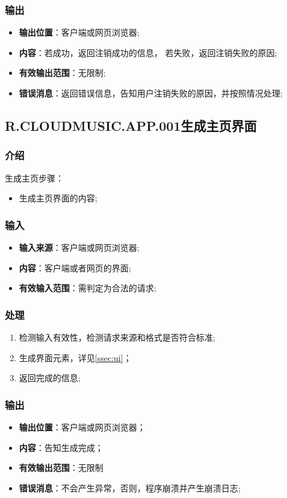 \begin{enumerate}
\subsubsection{输出}
\begin{itemize}
	\item \textbf{输出位置}：客户端或网页浏览器;
	\item \textbf{内容}：若成功，返回注销成功的信息，
		若失败，返回注销失败的原因;
	\item \textbf{有效输出范围}：无限制;
	\item \textbf{错误消息}：返回错误信息，告知用户注销失败的原因，并按照情况处理;
\end{itemize}

\subsection{R.CLOUDMUSIC.APP.001生成主页界面}
\subsubsection{介绍}
生成主页步骤：
	\begin{itemize}
		\item 生成主页界面的内容;
	\end{itemize}
\subsubsection{输入}
	\begin{itemize}
		\item \textbf{输入来源}：客户端或网页浏览器;
		\item \textbf{内容}：客户端或者网页的界面;
		\item \textbf{有效输入范围}：需判定为合法的请求;
	\end{itemize}
\subsubsection{处理}
	\begin{enumerate}
		\item 检测输入有效性，检测请求来源和格式是否符合标准;
		\item 生成界面元素，详见\ref{ssec:ui}；
		\item 返回完成的信息;
	\end{enumerate}
\subsubsection{输出}
\begin{itemize}
	\item \textbf{输出位置}：客户端或网页浏览器；
	\item \textbf{内容}：告知生成完成；
	\item \textbf{有效输出范围}：无限制
	\item \textbf{错误消息}：不会产生异常，否则，程序崩溃并产生崩溃日志;
\end{itemize}


\end{enumerate}
